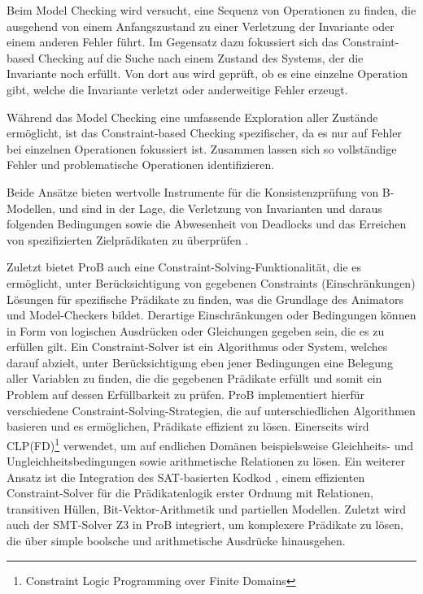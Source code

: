 Beim Model Checking wird versucht, eine Sequenz von Operationen zu finden, die ausgehend von einem Anfangszustand
zu einer Verletzung der Invariante oder einem anderen Fehler führt.
Im Gegensatz dazu fokussiert sich das Constraint-based Checking auf die Suche nach einem Zustand des Systems,
der die Invariante noch erfüllt. Von dort aus wird geprüft, ob es eine einzelne Operation gibt,
welche die Invariante verletzt oder anderweitige Fehler erzeugt.

Während das Model Checking eine umfassende Exploration aller Zustände ermöglicht, ist das Constraint-based Checking spezifischer,
da es nur auf Fehler bei einzelnen Operationen fokussiert ist.
Zusammen lassen sich so vollständige Fehler und problematische Operationen identifizieren.

Beide Ansätze bieten wertvolle Instrumente für die Konsistenzprüfung von B-Modellen, und sind in der Lage, die Verletzung von Invarianten und daraus folgenden Bedingungen sowie
die Abwesenheit von Deadlocks und das Erreichen von spezifizierten Zielprädikaten zu überprüfen \cite{leuschel2008prob}.

Zuletzt bietet ProB auch eine Constraint-Solving-Funktionalität, die es ermöglicht, unter Berücksichtigung von gegebenen Constraints (Einschränkungen) Lösungen für spezifische Prädikate zu finden,
was die Grundlage des Animators und Model-Checkers bildet.
Derartige Einschränkungen oder Bedingungen können in Form von logischen Ausdrücken oder Gleichungen gegeben sein, die es zu erfüllen gilt.
Ein Constraint-Solver ist ein Algorithmus oder System, welches darauf abzielt, unter Berücksichtigung eben jener Bedingungen eine Belegung aller Variablen zu finden, die die gegebenen Prädikate erfüllt
und somit ein Problem auf dessen Erfüllbarkeit zu prüfen.
ProB implementiert hierfür verschiedene Constraint-Solving-Strategien, die auf unterschiedlichen Algorithmen basieren und es ermöglichen, Prädikate effizient zu lösen.
Einerseits wird CLP(FD)\footnote{Constraint Logic Programming over Finite Domains} \cite{codognet1996compiling} verwendet, um auf endlichen Domänen beispielsweise Gleichheits- und Ungleichheitsbedingungen sowie arithmetische Relationen zu lösen.
Ein weiterer Ansatz ist die Integration des SAT-basierten Kodkod \cite{torlak2007kodkod},
einem effizienten Constraint-Solver für die Prädikatenlogik erster Ordnung mit Relationen, transitiven Hüllen, Bit-Vektor-Arithmetik und partiellen Modellen.
Zuletzt wird auch der SMT-Solver Z3 in ProB integriert, um komplexere Prädikate zu lösen, die über simple boolsche und arithmetische Ausdrücke hinausgehen.

